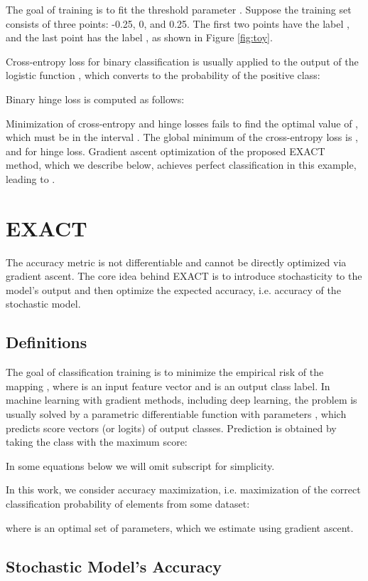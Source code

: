 \documentclass[nohyperref]{article}
\theoremstyle{plain}
\theoremstyle{definition}
\theoremstyle{remark}
\begin{document}
The goal of training is to fit the threshold parameter . Suppose the training set consists of three points: -0.25, 0, and 0.25. The first two points have the label , and the last point has the label , as shown in Figure \ref{fig:toy}.

Cross-entropy loss for binary classification is usually applied to the output of the logistic function , which converts  to the probability of the positive class:

Binary hinge loss is computed as follows:


Minimization of cross-entropy and hinge losses fails to find the optimal value of , which must be in the interval . The global minimum of the cross-entropy loss is , and  for hinge loss. Gradient ascent optimization of the proposed EXACT method, which we describe below, achieves perfect classification in this example, leading to .

\section{EXACT}
The accuracy metric is not differentiable and cannot be directly optimized via gradient ascent. The core idea behind EXACT is to introduce stochasticity to the model's output and then optimize the expected accuracy, i.e. accuracy of the stochastic model.

\subsection{Definitions}
The goal of classification training is to minimize the empirical risk of the mapping , where  is an input feature vector and  is an output class label. In machine learning with gradient methods, including deep learning, the problem is usually solved by a parametric differentiable function  with parameters , which predicts score vectors (or logits) of output classes. Prediction is obtained by taking the class with the maximum score:

In some equations below we will omit  subscript for simplicity.

In this work, we consider accuracy maximization, i.e. maximization of the correct classification probability of elements  from some dataset:


where  is an optimal set of parameters, which we estimate using gradient ascent.

\subsection{Stochastic Model's Accuracy}
\end{document}
